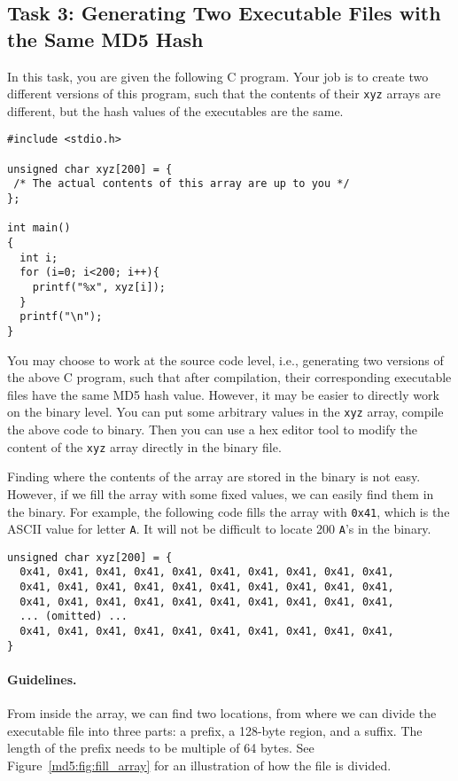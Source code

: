 \subsection{Task 3: Generating Two Executable Files with the Same MD5 Hash}

In this task, you are given the following C program.
Your job is to create two different versions of this program, such that
the contents of their \texttt{xyz} arrays are different, but the
hash values of the executables are the same. 


\begin{lstlisting}
#include <stdio.h>

unsigned char xyz[200] = {
 /* The actual contents of this array are up to you */
};

int main()
{
  int i;
  for (i=0; i<200; i++){
    printf("%x", xyz[i]);
  }
  printf("\n");
}
\end{lstlisting}
 

You may choose to work at the source code level, i.e., generating two
versions of the above C program, such that after compilation, their 
corresponding executable files have the same MD5 hash value. However,
it may be easier to directly work on the binary level. You can 
put some arbitrary values in the \texttt{xyz} array,  
compile the above code to binary. Then you can use a hex editor 
tool to modify the content of the \texttt{xyz} array directly
in the binary file. 

Finding where the contents of the array are stored in the binary is 
not easy. However, if we fill the array with some fixed values, we can easily find 
them in the binary. For example, the following code 
fills the array with \texttt{0x41}, which is the ASCII value 
for letter \texttt{A}. It will not be difficult to 
locate 200 \texttt{A}'s in the binary. 


\begin{lstlisting}
unsigned char xyz[200] = {
  0x41, 0x41, 0x41, 0x41, 0x41, 0x41, 0x41, 0x41, 0x41, 0x41,
  0x41, 0x41, 0x41, 0x41, 0x41, 0x41, 0x41, 0x41, 0x41, 0x41,
  0x41, 0x41, 0x41, 0x41, 0x41, 0x41, 0x41, 0x41, 0x41, 0x41,
  ... (omitted) ...
  0x41, 0x41, 0x41, 0x41, 0x41, 0x41, 0x41, 0x41, 0x41, 0x41,
}
\end{lstlisting}
 

\paragraph{Guidelines.}
From inside the array, we can find two locations, from
where we can divide the executable file into three parts:
a prefix, a 128-byte region, and a suffix.
The length of the prefix needs to be multiple of 64 bytes.
See Figure~\ref{md5:fig:fill_array} for an illustration
of how the file is divided. 

